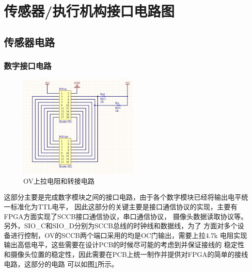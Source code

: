 \documentclass[a4paper]{paper}
\begin{document}
\section{传感器/执行机构接口电路图}
\subsection{传感器电路}
\subsubsection{数字接口电路}
\begin{figure}
    \centering
    \includegraphics[width = 60mm]{../preview/ov47.jpg}
    \caption{OV上拉电阻和转接电路}
    \label{OV}
\end{figure}
这部分主要是完成数字模块之间的接口电路，由于各个数字模块已经将输出电平统一标准化为TTL电平，
因此这部分的关键主要是接口通信协议的实现，主要有FPGA方面实现了SCCB接口通信协议，串口通信协议，
摄像头数据读取协议等。另外，SIO\_C和SIO\_D分别为SCCB总线的时钟线和数据线，为了
方面对多个设备进行控制，OV的SCCB两个端口采用的均是OC门输出，需要上拉4.7k
电阻实现输出高低电平，这些需要在设计PCB的时候尽可能的考虑到并保证接线的
稳定性和摄像头位置的稳定性，因此需要在PCB上统一制作并提供对FPGA的简单的接线电路，这部分的电路
可以如图\ref{OV}所示。
\end{document}
